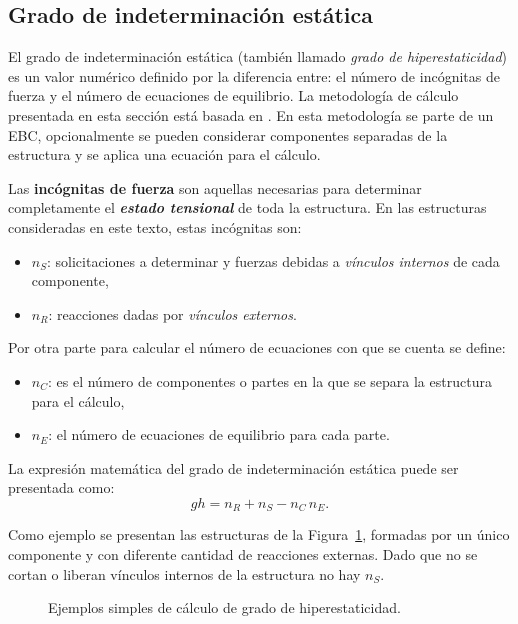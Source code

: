 \subsection{Grado de indeterminación estática}

El grado de indeterminación estática (también llamado \textit{grado de hiperestaticidad}) es un valor numérico definido por la diferencia entre: el número de incógnitas de fuerza y el número de ecuaciones de equilibrio. %
%
La metodología de cálculo presentada en esta sección está basada en \citep{CerveraRuiz2002ii}. %
%
En esta metodología se parte de un EBC, opcionalmente se pueden considerar componentes separadas de la estructura y se aplica una ecuación para el cálculo.

Las \textbf{incógnitas de fuerza} son aquellas necesarias para determinar completamente el \textit{\textbf{estado tensional}} de toda la estructura. En las estructuras consideradas en este texto, estas incógnitas son:
%
\begin{itemize}
	\item $n_S$: solicitaciones a determinar y fuerzas debidas a \textit{vínculos internos} de cada componente,
	\item $n_R$: reacciones dadas por \textit{vínculos externos}.
\end{itemize}


Por otra parte para calcular el número de ecuaciones con que se cuenta se define:
%
\begin{itemize}
	\item $n_C$: es el número de componentes o partes en la que se separa la estructura para el cálculo,
	\item $n_E$: el número de ecuaciones de equilibrio para cada parte.
\end{itemize}

La expresión matemática del grado de indeterminación estática puede ser presentada como:
%
\begin{equation} \label{eqn:gradoh}
	gh = n_R + n_S - n_C \, n_{E}.
\end{equation}

Como ejemplo se presentan las estructuras de la Figura~\ref{fig:ejemghSimp}, formadas por un único componente y con diferente cantidad de reacciones externas. Dado que no se cortan o liberan vínculos internos de la estructura no hay $n_S$.

\begin{figure}[htb]
	\centering
	\def\svgwidth{0.95\textwidth}
	
	\caption{Ejemplos simples de cálculo de grado de hiperestaticidad.}
	\label{fig:ejemghSimp}
\end{figure}

